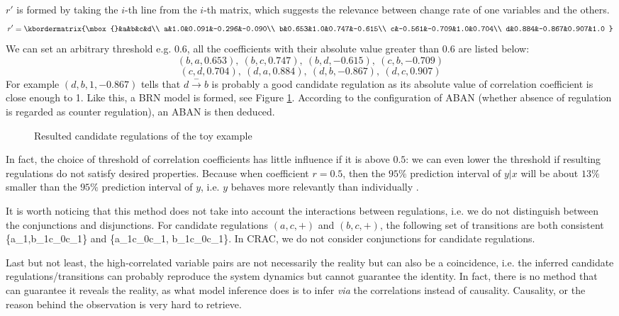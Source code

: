  $r'$ is formed by taking the $i$-th line from the $i$-th matrix, which suggests the relevance between change rate of one variables and the others.
$$r'=\kbordermatrix{\mbox{}&a&b&c&d\\
a&1.0&0.091&-0.296&-0.090\\
b&0.653&1.0&0.747&-0.615\\
c&-0.561&-0.709&1.0&0.704\\
d&0.884&-0.867&0.907&1.0
}$$
We can set an arbitrary threshold e.g. $0.6$, all the coefficients with their absolute value greater than $0.6$ are listed below:
$$(b,a,0.653),\ (b,c,0.747),\ (b,d,-0.615),\ (c,b,-0.709)$$
$$(c,d,0.704),\ (d,a,0.884),\ (d,b,-0.867),\ (d,c,0.907)$$
For example $(d,b,1,-0.867)$ tells that $d\xrightarrow{-}b$ is probably a good candidate regulation as its absolute value of correlation coefficient is close enough to 1. Like this, a BRN model is formed, see Figure \ref{ResultBRN}. According to the configuration of ABAN (whether absence of regulation is regarded as counter regulation), an ABAN is then deduced.

\begin{figure}[ht]
\centering

\caption{Resulted candidate regulations of the toy example}\label{ResultBRN}
\end{figure}

In fact, the choice of threshold of correlation coefficients has little influence if it is above $0.5$: we can even lower the threshold if resulting regulations do not satisfy desired properties.
Because when coefficient $r =0.5$, then the $95\%$ prediction interval of $y|x$ will be about $13\%$ smaller than the $95\%$ prediction interval of $y$, i.e. $y$ behaves more relevantly than individually \cite{hull1927correlation}.

It is worth noticing that this method does not take into account the interactions between regulations, i.e. we do not distinguish between the conjunctions and disjunctions.
For candidate regulations $(a,c,+)$ and $(b,c,+)$, the following set of transitions are both consistent \{\ac{a_1,b_1}{c_0}{c_1}\} and \{\ac{a_1}{c_0}{c_1}, \ac{b_1}{c_0}{c_1}\}.
In CRAC, we do not consider conjunctions for candidate regulations.

Last but not least, the high-correlated variable pairs are not necessarily the reality but can also be a coincidence, i.e. the inferred candidate regulations/transitions can probably reproduce the system dynamics but cannot guarantee the identity.
In fact, there is no method that can guarantee it reveals the reality, as what model inference does is to infer \textit{via} the correlations instead of causality.
Causality, or the reason behind the observation is very hard to retrieve.

